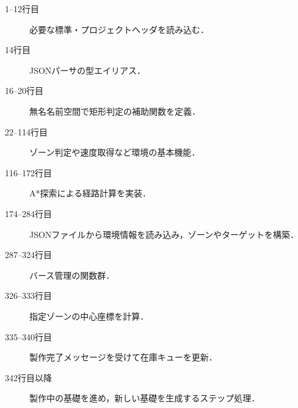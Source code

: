 \documentclass[10pt,letterpaper]{jsarticle}
\begin{document}
\begin{description}
  \item[1--12行目] 必要な標準・プロジェクトヘッダを読み込む．
  \item[14行目] JSONパーサの型エイリアス．
  \item[16--20行目] 無名名前空間で矩形判定の補助関数を定義．
  \item[22--114行目] ゾーン判定や速度取得など環境の基本機能．
  \item[116--172行目] A*探索による経路計算を実装．
  \item[174--284行目] JSONファイルから環境情報を読み込み，ゾーンやターゲットを構築．
  \item[287--324行目] バース管理の関数群．
  \item[326--333行目] 指定ゾーンの中心座標を計算．
  \item[335--340行目] 製作完了メッセージを受けて在庫キューを更新．
  \item[342行目以降] 製作中の基礎を進め，新しい基礎を生成するステップ処理．
\end{description}
\end{document}

